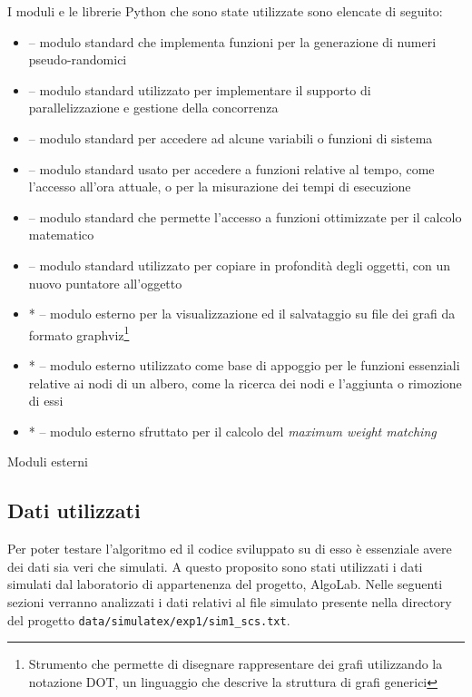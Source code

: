 I moduli e le librerie Python che sono state utilizzate sono elencate di seguito: \begin{itemize}
  \item {} -- modulo standard che implementa funzioni per la generazione di numeri pseudo-randomici
  \item {} -- modulo standard utilizzato per implementare il supporto di parallelizzazione e gestione della concorrenza
  \item {} -- modulo standard per accedere ad alcune variabili o funzioni di sistema
  \item {} -- modulo standard usato per accedere a funzioni relative al tempo, come l'accesso all'ora attuale, o per la misurazione dei tempi di esecuzione
  \item {} -- modulo standard che permette l'accesso a funzioni ottimizzate per il calcolo matematico
  \item {} -- modulo standard utilizzato per copiare in profondità degli oggetti, con un nuovo puntatore all'oggetto
  \item *  -- modulo esterno per la visualizzazione ed il salvataggio su file dei grafi da formato graphviz\footnote{Strumento che permette di disegnare rappresentare dei grafi utilizzando la notazione DOT, un linguaggio che descrive la struttura di grafi generici}
  \item *  -- modulo esterno utilizzato come base di appoggio per le funzioni essenziali relative ai nodi di un albero, come la ricerca dei nodi e l'aggiunta o rimozione di essi
  \item *  -- modulo esterno sfruttato per il calcolo del \textit{maximum weight matching}
\end{itemize}

\small * Moduli esterni

\subsection{Dati utilizzati}
Per poter testare l'algoritmo ed il codice sviluppato su di esso è essenziale avere dei dati sia veri che simulati. A questo proposito sono stati utilizzati i dati simulati dal laboratorio di appartenenza del progetto, AlgoLab. Nelle seguenti sezioni verranno analizzati i dati relativi al file simulato presente nella directory del progetto \texttt{data/simulatex/exp1/sim1\_scs.txt}.

